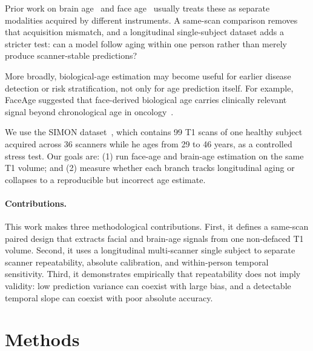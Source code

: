 \documentclass[11pt]{article}
\begin{document}
Prior work on brain age~\citep{peng2021sfcn, puglisi2024synthba} and face
age~\citep{bontempi2025faceage} usually treats these as separate modalities
acquired by different instruments.  A same-scan comparison removes that
acquisition mismatch, and a longitudinal single-subject dataset adds a stricter
test: can a model follow aging within one person rather than merely produce
scanner-stable predictions?

More broadly, biological-age estimation may become useful for earlier disease
detection or risk stratification, not only for age prediction itself.  For
example, FaceAge suggested that face-derived biological age carries clinically
relevant signal beyond chronological age in oncology~\citep{bontempi2025faceage}.

We use the SIMON dataset~\citep{duchesne2019simon}, which contains 99 T1 scans of one
healthy subject acquired across 36 scanners while he ages from 29 to 46
years, as a controlled stress test.  Our goals are: (1) run face-age and
brain-age estimation on the same T1 volume; and (2) measure whether each
branch tracks longitudinal aging or collapses to a reproducible but incorrect
age estimate.

\paragraph{Contributions.}
This work makes three methodological contributions. First, it defines a
same-scan paired design that extracts facial and brain-age signals from one
non-defaced T1 volume. Second, it uses a longitudinal multi-scanner single
subject to separate scanner repeatability, absolute calibration, and
within-person temporal sensitivity. Third, it demonstrates empirically that
repeatability does not imply validity: low prediction variance can coexist
with large bias, and a detectable temporal slope can coexist with poor
absolute accuracy.

\section{Methods}
\end{document}
